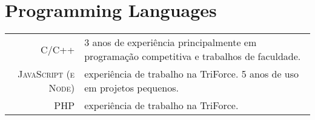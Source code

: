 \documentclass[a4paper,10pt]{article} %
\begin{document}
\section{Programming Languages}

\begin{tabular}{rp{10cm}}
\textsc{C/C++}                 & \footnotesize{3 anos de experiência principalmente em programação competitiva e trabalhos de faculdade.} \\[0.4cm]
\textsc{JavaScript (e Node)} & \footnotesize{experiência de trabalho na TriForce. 5 anos de uso em projetos pequenos.} \\[0.4cm]
\textsc{PHP}       & \footnotesize{experiência de trabalho na TriForce.} \\
\end{tabular}

\end{document}
